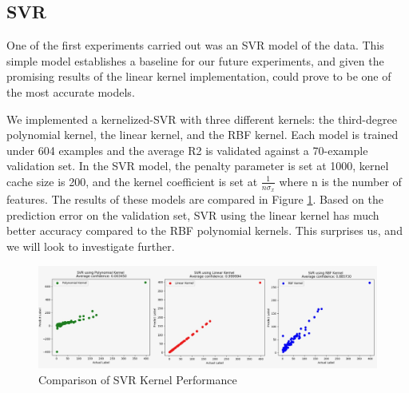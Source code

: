 \documentclass{article}
\begin{document}
	
	\subsection{SVR}
	One of the first experiments carried out was an SVR model of the data. This simple model establishes a baseline for our future experiments, and given the promising results of the linear kernel implementation, could prove to be one of the most accurate models.
	
	We implemented a kernelized-SVR with three different kernels: the third-degree polynomial kernel, the linear kernel, and the RBF kernel. Each model is trained under 604 examples and the average R2 is validated against a 70-example validation set. In the SVR model, the penalty parameter is set at 1000, kernel cache size is 200, and the kernel coefficient  is set at $\frac{1}{n \sigma_x}$ where n is the number of features. The results of these models are compared in Figure \ref*{fig:svr_kern}. Based on the prediction error on the validation set, SVR using the linear kernel has much better accuracy compared to the RBF polynomial kernels. This surprises us, and we will look to investigate further.
	
	
	\begin{figure}[H]
		\centering
		\includegraphics[scale=0.18]{"svr_kernels"}
		\caption{Comparison of SVR Kernel Performance}
		\label{fig:svr_kern}
	\end{figure}
	
\end{document}
